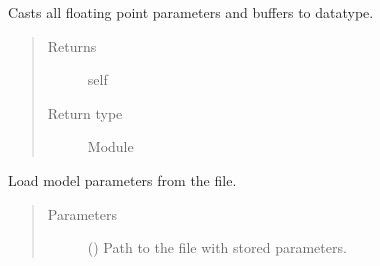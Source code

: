 \documentclass[letterpaper,10pt,english]{sphinxmanual}
\begin{document}
\begin{fulllineitems}
\begin{fulllineitems}
\begin{quote}
\begin{description}
\begin{itemize}
\end{itemize}


\end{description}\end{quote}

\end{fulllineitems}


\begin{fulllineitems}
\label{\detokenize{api/autoencoding:geology.metamodelling.SpatialAutoencoder.half}}
Casts all floating point parameters and buffers to  datatype.
\begin{quote}\begin{description}
\item[{Returns}] \leavevmode
self

\item[{Return type}] \leavevmode
Module

\end{description}\end{quote}

\end{fulllineitems}


\begin{fulllineitems}
\label{\detokenize{api/autoencoding:geology.metamodelling.SpatialAutoencoder.load}}
Load model parameters from the file.
\begin{quote}\begin{description}
\item[{Parameters}] \leavevmode
{} () \textendash{} Path to the file with stored parameters.

\end{description}\end{quote}

\end{fulllineitems}



\end{fulllineitems}
\end{document}
